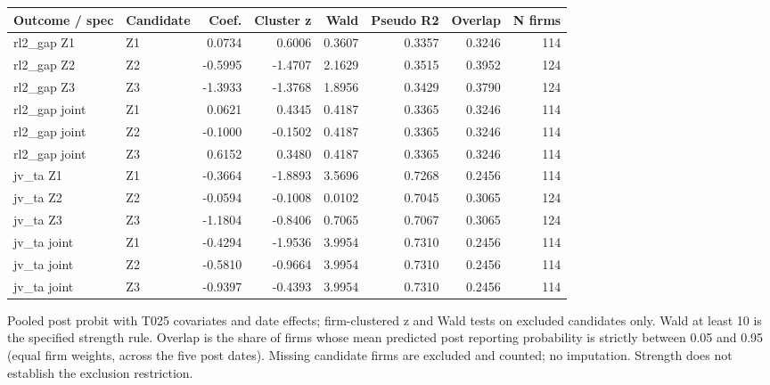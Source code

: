 \begin{tabular}{llrrrrrr}
\toprule
Outcome / spec & Candidate & Coef. & Cluster z & Wald & Pseudo R2 & Overlap & N firms \\
\midrule
rl2\_gap Z1 & Z1 & 0.0734 & 0.6006 & 0.3607 & 0.3357 & 0.3246 & 114 \\
rl2\_gap Z2 & Z2 & -0.5995 & -1.4707 & 2.1629 & 0.3515 & 0.3952 & 124 \\
rl2\_gap Z3 & Z3 & -1.3933 & -1.3768 & 1.8956 & 0.3429 & 0.3790 & 124 \\
rl2\_gap joint & Z1 & 0.0621 & 0.4345 & 0.4187 & 0.3365 & 0.3246 & 114 \\
rl2\_gap joint & Z2 & -0.1000 & -0.1502 & 0.4187 & 0.3365 & 0.3246 & 114 \\
rl2\_gap joint & Z3 & 0.6152 & 0.3480 & 0.4187 & 0.3365 & 0.3246 & 114 \\
jv\_ta Z1 & Z1 & -0.3664 & -1.8893 & 3.5696 & 0.7268 & 0.2456 & 114 \\
jv\_ta Z2 & Z2 & -0.0594 & -0.1008 & 0.0102 & 0.7045 & 0.3065 & 124 \\
jv\_ta Z3 & Z3 & -1.1804 & -0.8406 & 0.7065 & 0.7067 & 0.3065 & 124 \\
jv\_ta joint & Z1 & -0.4294 & -1.9536 & 3.9954 & 0.7310 & 0.2456 & 114 \\
jv\_ta joint & Z2 & -0.5810 & -0.9664 & 3.9954 & 0.7310 & 0.2456 & 114 \\
jv\_ta joint & Z3 & -0.9397 & -0.4393 & 3.9954 & 0.7310 & 0.2456 & 114 \\
\bottomrule
\end{tabular}
\par\medskip
\footnotesize Pooled post probit with T025 covariates and date effects; firm-clustered z and Wald tests on excluded candidates only. Wald at least 10 is the specified strength rule. Overlap is the share of firms whose mean predicted post reporting probability is strictly between 0.05 and 0.95 (equal firm weights, across the five post dates). Missing candidate firms are excluded and counted; no imputation. Strength does not establish the exclusion restriction.
\endgroup

